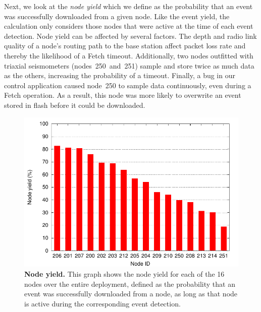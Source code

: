 Next, we look at the {\em node yield} which we define as the probability that
an event was successfully downloaded from a given node.  Like the event
yield, the calculation only considers those nodes that were active at the
time of each event detection.  Node yield can be affected by several factors.
The depth and radio link quality of a node's routing path to the base station
affect packet loss rate and thereby the likelihood of a Fetch timeout.
Additionally, two nodes outfitted with triaxial seismometers
(nodes~250~and~251) sample and store twice as much data as the others,
increasing the probability of a timeout.  Finally, a bug in our control
application caused node~250 to sample data continuously, even during a Fetch
operation. As a result, this node was more likely to overwrite an event
stored in flash before it could be downloaded.

\begin{figure}[t]
\label{evaluation-fig-nodeYield}
\begin{center}
\includegraphics[width=\hsize]{./5-evaluation/figs/performance/yields/nodeYield/nodeYieldOnly.pdf}
\end{center}
\caption{\textbf{Node yield.}
This graph shows the node yield for each of the 16 nodes over the entire
deployment, defined as the probability that an event was successfully
downloaded from a node, as long as that node is active during the
corresponding event detection.}
\end{figure}


